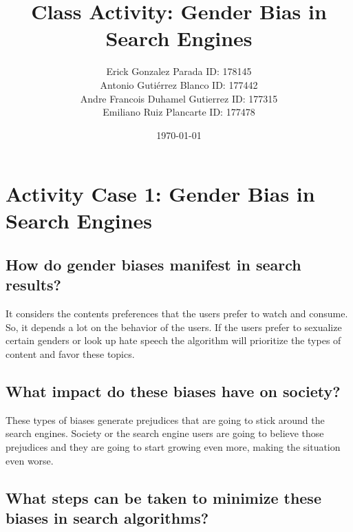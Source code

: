 \documentclass[twoside]{article}
\begin{document}

\renewcommand{\footrulewidth}{1pt}

\title{Class Activity: Gender Bias in Search Engines}
\author{Erick Gonzalez Parada ID: 178145 \\ \vspace{2mm}
Antonio Gutiérrez Blanco ID: 177442 \\ \vspace{2mm}
Andre Francois Duhamel Gutierrez ID: 177315 \\ \vspace{2mm}
Emiliano Ruiz Plancarte ID: 177478}
\date{\today}


\maketitle

\newpage

\section*{Activity Case 1: Gender Bias in Search Engines}

\subsection*{How do gender biases manifest in search results?}
\begin{justifying}
It considers the contents preferences that the users prefer to watch and consume. So, it depends a lot on the behavior of the users. If the users prefer to sexualize certain genders or look up hate speech the algorithm will prioritize the types of content and favor these topics.
\end{justifying}

\subsection*{What impact do these biases have on society?}
\begin{justifying}
These types of biases generate prejudices that are going to stick around the search engines. Society or the search engine users are going to believe those prejudices and they are going to start growing even more, making the situation even worse.
\end{justifying}

\subsection*{What steps can be taken to minimize these biases in search algorithms?}
\begin{justifying}
\end{justifying}
\end{document}
